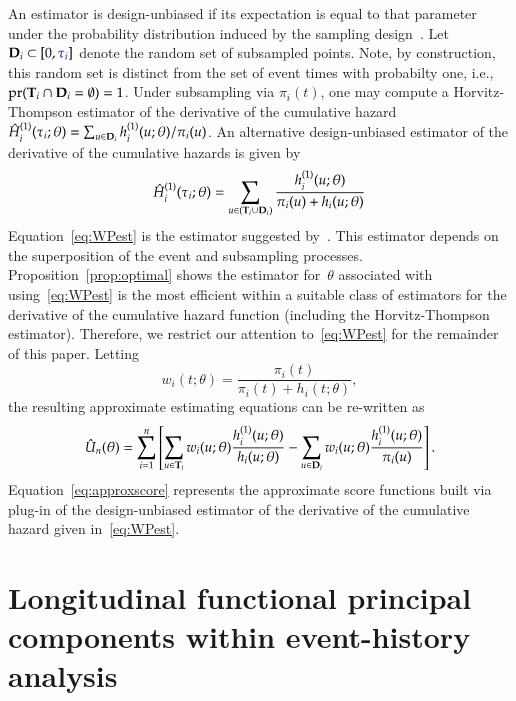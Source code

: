 \documentclass[12pt]{amsart}
\def\pr{\mathop{\text{pr}}\nolimits}
\def\pr{\mathop{\text{pr}}\nolimits}
\def\bfT{{\bf T}}
\def\bfD{{\bf D}}
\begin{document}
An estimator is design-unbiased if its expectation is equal to that parameter under the probability distribution induced by the sampling design~\citep{Cassel1977}. Let~$\bfD_i \subset [0,\textcolor{blue}{\tau_i}]$ denote the random set of subsampled points.  Note, by construction, this random set is distinct from the set of event times with probabilty one, i.e.,~$\pr( \bfT_i \cap \bfD_i = \emptyset) = 1$.  Under subsampling via $\pi_i (t)$, one may compute a Horvitz-Thompson estimator of the derivative of the cumulative hazard $\hat H_{i}^{(1)} (\tau_i; \theta) = \sum_{u \in \bfD_i} h^{(1)}_i (u; \theta)/\pi_i (u)$. An alternative design-unbiased estimator of the derivative of the cumulative hazards is given by
\begin{equation}
\label{eq:WPest}
\hat H_{i}^{(1)} (\tau_i; \theta) = \sum_{u \in (\bfT_i \cup \bfD_i)}
\frac{ h^{(1)}_i ( u; \theta ) }{ \pi_i (u) + h_i ( u ; \theta) }
\end{equation}
Equation~\eqref{eq:WPest} is the estimator suggested by~\cite{Waagepetersen2008}.  This estimator depends on the superposition of the event and subsampling processes. Proposition~\ref{prop:optimal} shows the estimator for~$\theta$ associated with using~\eqref{eq:WPest} is the most efficient within a suitable class of estimators for the derivative of the cumulative hazard function (including the Horvitz-Thompson estimator). Therefore, we restrict our attention to~\eqref{eq:WPest} for the remainder of this paper. Letting
\begin{equation}
\label{eq:waage_weights}
w_i (t; \theta) = \frac{\pi_i (t)}{\pi_i (t) + h_i (t ; \theta)},
\end{equation}
the resulting approximate estimating equations can be re-written as
\begin{equation}
\label{eq:approxscore}
\hat{U}_n (\theta) = \sum_{i=1}^n \left[ \sum_{u \in \bfT_i} w_i(u; \theta)
  \frac{h^{(1)}_i (u; \theta)}{ h_i ( u; \theta)}  - \sum_{u \in \bfD_i} w_i(u;
  \theta) \frac{h_i^{(1)} (u; \theta)}{ \pi_i (u) } \right].
\end{equation}
Equation~\eqref{eq:approxscore} represents the approximate score functions built via plug-in of the design-unbiased estimator of the derivative of the cumulative hazard given in~\eqref{eq:WPest}.

\section{Longitudinal functional principal components within
  event-history analysis}
  \label{section:longfpc}
\end{document}
